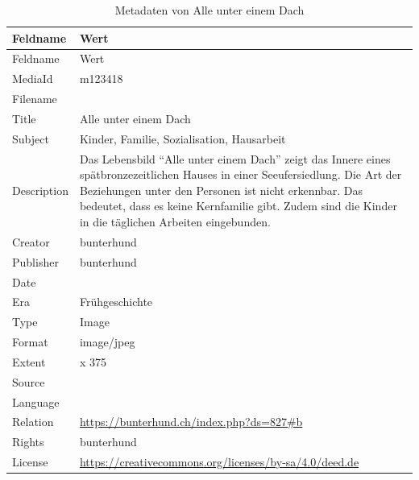 \documentclass[
  letterpaper,
  DIV=11,
  numbers=noendperiod]{scrartcl}
\begin{document}
\begin{longtable}[]{@{}
  >{\raggedright\arraybackslash}p{}
  >{\raggedright\arraybackslash}p{}@{}}
\caption{Metadaten von Alle unter einem
Dach}\label{tbl-metadaten-alle-unter-einem-dach}\tabularnewline
\toprule\noalign{}
\begin{minipage}[b]{\linewidth}\raggedright
Feldname
\end{minipage} & \begin{minipage}[b]{\linewidth}\raggedright
Wert
\end{minipage} \\
\midrule\noalign{}
\endfirsthead
\toprule\noalign{}
\begin{minipage}[b]{\linewidth}\raggedright
Feldname
\end{minipage} & \begin{minipage}[b]{\linewidth}\raggedright
Wert
\end{minipage} \\
\midrule\noalign{}
\endhead
\bottomrule\noalign{}
\endlastfoot
MediaId & m123418 \\
Filename & \\
Title & Alle unter einem Dach \\
Subject & Kinder, Familie, Sozialisation, Hausarbeit \\
Description & Das Lebensbild ``Alle unter einem Dach'' zeigt das Innere
eines spätbronzezeitlichen Hauses in einer Seeufersiedlung. Die Art der
Beziehungen unter den Personen ist nicht erkennbar. Das bedeutet, dass
es keine Kernfamilie gibt. Zudem sind die Kinder in die täglichen
Arbeiten eingebunden. \\
Creator & bunterhund \\
Publisher & bunterhund \\
Date & \\
Era & Frühgeschichte \\
Type & Image \\
Format & image/jpeg \\
Extent & 1129 x 375 \\
Source & \\
Language & \\
Relation & \url{https://bunterhund.ch/index.php?ds=827\#b} \\
Rights & bunterhund \\
License &
\url{https://creativecommons.org/licenses/by-sa/4.0/deed.de} \\
\end{longtable}
\end{document}
